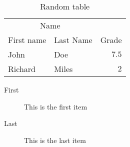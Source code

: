 



\begin{table}
\caption{Random table}
\centering
	\begin{tabular}{llr}
		\toprule
		\multicolumn{2}{c}{Name} \\
		\cmidrule(r){1-2}
			First name & Last Name & Grade \\
		\midrule
			John & Doe & $7.5$ \\
			Richard & Miles & $2$ \\
		\bottomrule
	\end{tabular}
\end{table}

\begin{description}
	\item[First] This is the first item
	\item[Last] This is the last item
\end{description}


